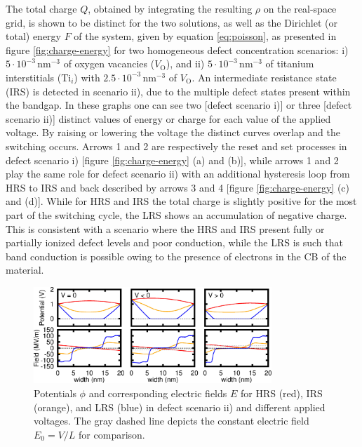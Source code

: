 The total charge $Q$, obtained by integrating the resulting $\rho$ on the real-space grid, is shown to be distinct for the two solutions, as well as the Dirichlet (or total) energy $F$ of the system, given by equation \ref{eq:poisson}, as presented in figure \ref{fig:charge-energy} for two homogeneous defect concentration scenarios: i) $5 \cdot 10^{-3} \, \text{nm}^{-3}$ of oxygen vacancies ($V_{\text{O}}$), and ii) $5 \cdot 10^{-3} \, \text{nm}^{-3}$ of titanium interstitials (Ti$_i$) with $2.5 \cdot 10^{-3} \, \text{nm}^{-3}$ of $V_{\text{O}}$. An intermediate resistance state (IRS) is detected in scenario ii), due to the multiple defect states present within the bandgap. In these graphs one can see two [defect scenario i)] or three [defect scenario ii)] distinct values of energy or charge for each value of the applied voltage. By raising or lowering the voltage the distinct curves overlap and the switching occurs. Arrows 1 and 2 are respectively the reset and set processes in defect scenario i) [figure \ref{fig:charge-energy} (a) and (b)], while arrows 1 and 2 play the same role for defect scenario ii) with an additional hysteresis loop from HRS to IRS and back described by arrows 3 and 4 [figure \ref{fig:charge-energy} (c) and (d)]. While for HRS and IRS the total charge is slightly positive for the most part of the switching cycle, the LRS shows an accumulation of negative charge. This is consistent with a scenario where the HRS and IRS present fully or partially ionized defect levels and poor conduction, while the LRS is such that band conduction is possible owing to the presence of electrons in the CB of the material.
\begin{center}
  \begin{figure}[h!]
    \begin{center}
      \includegraphics[width=0.8\textwidth]{img/field.jpg}    
      \caption{Potentials $\phi$ and corresponding electric fields $E$ for HRS (red), IRS (orange), and LRS (blue) in defect scenario ii) and different applied voltages. The gray dashed line depicts the constant electric field $E_0 = V/L$ for comparison.} 
      \label{fig:field-pot} 
    \end{center}
  \end{figure}
\end{center}

